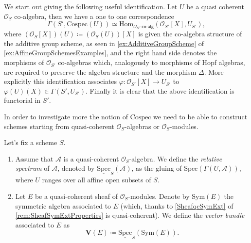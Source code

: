 \begin{rem}[]\label{rem:CospecSections}
	We start out giving the following useful identification.
	Let $U$ be a quasi coherent $\mathcal{O}_{ S }$ co-algebra,
	then we have a one to one correspondence
	\begin{equation*}
	\Gamma(S', \mathrm{Cospec}(U)) \simeq
	\mathrm{Hom}_{ \mathcal{O}_{ S' }\text{-}\mathsf{co}\text{-}\mathsf{alg}} 
	\left( \mathcal{O}_{ S' }[X], U_{S'} \right)
	,\end{equation*}
	where $(\mathcal{O}_{ S }[X])(U) \coloneqq (\mathcal{O}_{ S }(U))[X]$ 
	is given the co-algebra structure of the additive group scheme, as seen in
	\cref{ex:AdditiveGroupScheme} of \cref{ex:AffineGroupSchemesExamples},
	and the right hand side denotes the morphisms of $\mathcal{O}_{ S' }$
	co-algebras which, analogously to morphisms of Hopf algebras, 
	are required to preserve the algebra structure and the morphism $\Delta$.
	More explicitly this identification associates
	$\varphi\colon \mathcal{O}_{ S' }[X] \to U_{S'}$ to
	$\varphi(U)(X) \in \Gamma(S', U_{S'})$.
	Finally it is clear that the above identification is functorial in $S'$.
\end{rem}


\noindent
In order to investigate more the notion of $\mathrm{Cospec}$ we need to 
be able to construct schemes starting from quasi-coherent $\mathcal{O}_{ S }$-algebras
or $\mathcal{O}_{ S }$-modules.


\begin{defn}
	Let's fix a scheme $S$.
\begin{enumerate}
	\item Assume that $\mathscr{A}$ is a quasi-coherent $\mathcal{O}_{ S }$-algebra.
		We define the {\em relative spectrum} of $\mathscr{A}$, denoted by
		$\underline{\mathrm{Spec}}_S(\mathscr{A})$, as the gluing of
		$\mathrm{Spec}(\Gamma(U, \mathscr{A}))$, where $U$ ranges
		over all affine open subsets of $S$.

	\item  Let $E$ be a quasi-coherent sheaf of $\mathcal{O}_{ S }$-modules.
		Denote by $\mathrm{Sym}(E)$ the symmetric algebra associated to 
		$E$ (which, thanks to \cref{SheafqcSymExt} of
		\cref{rem:SheafSymExtProperties} is quasi-coherent).
		We define the {\em vector bundle} associated to $E$ as
		\begin{equation*}
			\mathbf{V}(E) \coloneqq
			\underline{\mathrm{Spec}}_S (\mathrm{Sym}(E))
		.\end{equation*}
\end{enumerate}
\end{defn}


